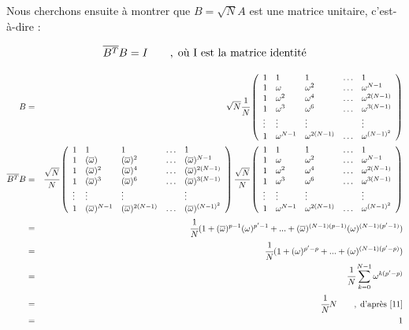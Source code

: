 \documentclass[a4paper,12pt]{report}
\begin{document}
	Nous cherchons ensuite \`a montrer que $B=\sqrt{N}A$ est une matrice unitaire, c'est-\`a-dire :

	\begin{equation}
		\overline{B^{T}}B=I\qquad,\;\text{o\`u I est la matrice identit\'e}\\
	\end{equation}

	\begin{eqnarray*}
		B&=&\sqrt{N}\cfrac{1}{N}\left(
								\begin{array}{lllll}
									1&1&1& \ldots&1\\
									1&\omega&\omega^2&\ldots&\omega^{N-1}\\
									1&\omega^2&\omega^4&\ldots&\omega^{2(N-1)}\\
									1&\omega^3&\omega^6&\ldots&\omega^{3(N-1)}\\
									\vdots&\vdots&\vdots&&\vdots\\
									1&\omega^{N-1}&\omega^{2(N-1)}&\ldots&\omega^{(N-1)^2}
								\end{array}
								\right)\\
		\overline{B^{T}}B&=&\cfrac{\sqrt{N}}{N}\left(
								\begin{array}{lllll}
									1&1&1& \ldots&1\\
									1&(\overline{\omega})&(\overline{\omega})^2&\ldots&(\overline{\omega})^{N-1}\\
									1&(\overline{\omega})^2&(\overline{\omega})^4&\ldots&(\overline{\omega})^{2(N-1)}\\
									1&(\overline{\omega})^3&(\overline{\omega})^6&\ldots&(\overline{\omega})^{3(N-1)}\\
									\vdots&\vdots&\vdots&&\vdots\\
									1&(\overline{\omega})^{N-1}&(\overline{\omega})^{2(N-1)}&\ldots&(\overline{\omega})^{(N-1)^2}
								\end{array}
								\right)
							\cfrac{\sqrt{N}}{N}\left(
								\begin{array}{lllll}
									1&1&1& \ldots&1\\
									1&\omega&\omega^2&\ldots&\omega^{N-1}\\
									1&\omega^2&\omega^4&\ldots&\omega^{2(N-1)}\\
									1&\omega^3&\omega^6&\ldots&\omega^{3(N-1)}\\
									\vdots&\vdots&\vdots&&\vdots\\
									1&\omega^{N-1}&\omega^{2(N-1)}&\ldots&\omega^{(N-1)^2}
								\end{array}
								\right)\\
						&=&\cfrac{1}{N}(1+(\overline{\omega})^{p-1}(\omega)^{p'-1}+...+(\overline{\omega})^{(N-1)(p-1)}(\omega)^{(N-1)(p'-1)})\\
						&=&\cfrac{1}{N}(1+(\omega)^{p'-p}+...+(\omega)^{(N-1)(p'-p)})\\
						&=&\cfrac{1}{N}\sum_{k=0}^{N-1}\omega^{k(p'-p)}\\
						&=&\cfrac{1}{N}N\qquad,\;\text{d'apr\`es \eqref{11}}\\
						&=&1\\
	\end{eqnarray*}
\end{document}
